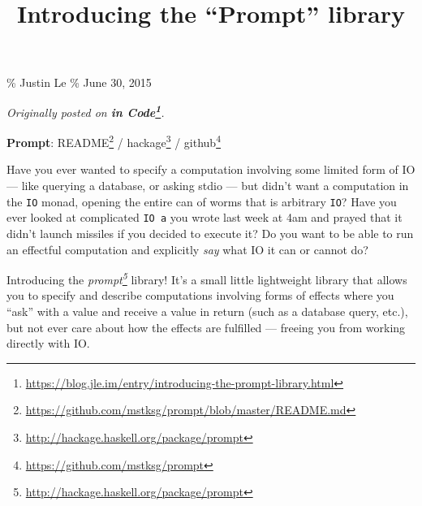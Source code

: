 \documentclass[]{article}
\title{Introducing the ``Prompt'' library}
\newenvironment{Shaded}{}{}
\newcommand{\CommentTok}[1]{\textcolor[rgb]{0.38,0.63,0.69}{\textit{#1}}}
\newcommand{\DataTypeTok}[1]{\textcolor[rgb]{0.56,0.13,0.00}{#1}}
\newcommand{\FunctionTok}[1]{\textcolor[rgb]{0.02,0.16,0.49}{#1}}
\newcommand{\KeywordTok}[1]{\textcolor[rgb]{0.00,0.44,0.13}{\textbf{#1}}}
\newcommand{\NormalTok}[1]{#1}
\newcommand{\OperatorTok}[1]{\textcolor[rgb]{0.40,0.40,0.40}{#1}}
\newcommand{\OtherTok}[1]{\textcolor[rgb]{0.00,0.44,0.13}{#1}}
\newcommand{\StringTok}[1]{\textcolor[rgb]{0.25,0.44,0.63}{#1}}
\renewcommand{\href}[2]{#2\footnote{\url{#1}}}
\begin{document}
\maketitle

\% Justin Le \% June 30, 2015

\emph{Originally posted on
\textbf{\href{https://blog.jle.im/entry/introducing-the-prompt-library.html}{in
Code}}.}

\textbf{Prompt}:
\href{https://github.com/mstksg/prompt/blob/master/README.md}{README} /
\href{http://hackage.haskell.org/package/prompt}{hackage} /
\href{https://github.com/mstksg/prompt}{github}

Have you ever wanted to specify a computation involving some limited form of IO
--- like querying a database, or asking stdio --- but didn't want a computation
in the \texttt{IO} monad, opening the entire can of worms that is arbitrary
\texttt{IO}? Have you ever looked at complicated \texttt{IO\ a} you wrote last
week at 4am and prayed that it didn't launch missiles if you decided to execute
it? Do you want to be able to run an effectful computation and explicitly
\emph{say} what IO it can or cannot do?

Introducing the \emph{\href{http://hackage.haskell.org/package/prompt}{prompt}}
library! It's a small little lightweight library that allows you to specify and
describe computations involving forms of effects where you ``ask'' with a value
and receive a value in return (such as a database query, etc.), but not ever
care about how the effects are fulfilled --- freeing you from working directly
with IO.

\begin{Shaded}
\end{Shaded}
\end{document}
